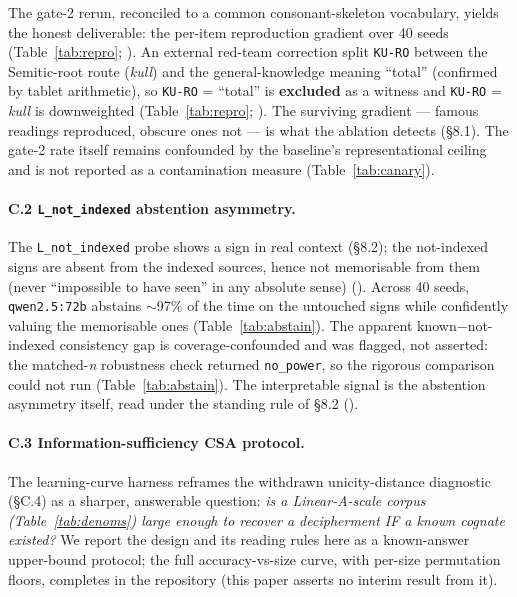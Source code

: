 The gate-2 rerun, reconciled to a common consonant-skeleton vocabulary,
yields the honest deliverable: the per-item reproduction gradient over 40
seeds (Table~\ref{tab:repro}; \artref). An
external red-team correction split \texttt{KU-RO} between the
Semitic-root route (\emph{kull}) and the general-knowledge meaning
``total'' (confirmed by tablet arithmetic), so \texttt{KU-RO} = ``total''
is \textbf{excluded} as a witness and \texttt{KU-RO} = \emph{kull} is
downweighted (Table~\ref{tab:repro}; \artref). The surviving gradient ---
famous readings reproduced, obscure ones not --- is what the ablation
detects (\S8.1). The gate-2 rate itself remains confounded by the baseline's
representational ceiling and is not reported as a contamination measure
(Table~\ref{tab:canary}).

\paragraph{C.2 \texttt{L\_not\_indexed} abstention asymmetry.} The
\texttt{L\_not\_indexed} probe shows a sign in real context (\S8.2); the
not-indexed signs are absent from the indexed
sources, hence not memorisable from them (never ``impossible to have seen''
in any absolute sense) (\artref). Across 40 seeds, \texttt{qwen2.5:72b}
abstains $\sim$97\% of
the time on the untouched signs while confidently valuing the memorisable
ones (Table~\ref{tab:abstain}). The apparent known$-$not-indexed
consistency gap is coverage-confounded and was flagged, not asserted: the
matched-\emph{n} robustness check returned \texttt{no\_power}, so the
rigorous comparison could not run (Table~\ref{tab:abstain}).
The interpretable signal is the abstention asymmetry itself, read under
the standing rule of \S8.2 (\artref).

\paragraph{C.3 Information-sufficiency CSA protocol.} The learning-curve
harness reframes the withdrawn unicity-distance diagnostic (\S C.4) as a
sharper, answerable question: \emph{is a Linear-A-scale corpus
(Table~\ref{tab:denoms}) large enough to recover a decipherment IF a
known cognate existed?} We report the design and its reading rules here as a known-answer
upper-bound protocol; the full accuracy-vs-size curve, with per-size
permutation floors, completes in the repository (this paper asserts no
interim result from it).

